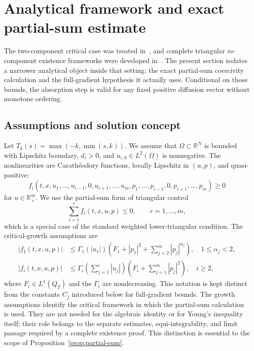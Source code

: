 \section{Analytical framework and exact partial-sum estimate}
\label{sec:theoretical}

The two-component critical case was treated in~\cite{alaa2001global}, and complete triangular $m$-component existence frameworks were developed in~\cite{alaa2013triangular,bouarifi2015climate}. The present section isolates a narrower analytical object inside that setting: the exact partial-sum coercivity calculation and the full-gradient hypothesis it actually uses. Conditional on those bounds, the absorption step is valid for any fixed positive diffusion vector without monotone ordering.

\subsection{Assumptions and solution concept}

Let $T_k(s)=\max(-k,\min(s,k))$. We assume that $\Omega\subset\mathbb R^N$ is bounded with Lipschitz boundary, $d_i>0$, and $u_{i,0}\in L^2(\Omega)$ is nonnegative. The nonlinearities are Carathéodory functions, locally Lipschitz in $(u,p)$, and quasi-positive:
\[
 f_i(t,x,u_1,\ldots,u_{i-1},0,u_{i+1},\ldots,u_m,p_1,\ldots,p_{i-1},0,p_{i+1},\ldots,p_m)\ge0
\]
for $u\in\mathbb R_+^m$. We use the partial-sum form of triangular control
\begin{equation}
 \sum_{i=1}^r f_i(t,x,u,p)\le0,
 \qquad r=1,\ldots,m,
 \label{eq:partial-mass}
\end{equation}
which is a special case of the standard weighted lower-triangular condition. The critical-growth assumptions are
\begin{align}
 |f_1(t,x,u,p)|&\le \Gamma_1(|u_1|)\left(F_1+|p_1|^2+\sum_{j=2}^m|p_j|^{\alpha_j}\right),\quad 1\le\alpha_j<2,\label{eq:growth1}\\
 |f_i(t,x,u,p)|&\le \Gamma_i\left(\sum_{j=1}^i|u_j|\right)\left(F_i+\sum_{j=1}^m|p_j|^2\right),\quad i\ge2,\label{eq:growth2}
\end{align}
where $F_i\in L^1(Q_T)$ and the $\Gamma_i$ are nondecreasing. This notation is kept distinct from the constants $C_j$ introduced below for full-gradient bounds.
The growth assumptions identify the critical framework in which the partial-sum calculation is used. They are not needed for the algebraic identity or for Young's inequality itself; their role belongs to the separate estimates, equi-integrability, and limit passage required by a complete existence proof. This distinction is essential to the scope of Proposition~\ref{prop:partial-sum}.


